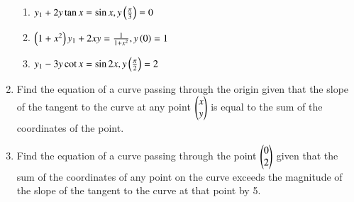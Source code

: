 \begin{enumerate}[label=\arabic*.,ref=\thesubsection.\theenumi]
\begin{enumerate}[label=(\roman*)]
%
\item  $y_1 + 2y\tan x = \sin x, y\left(\frac{\pi}{3}\right) = 0$
\item  $\left(1+x^2\right)y_1 + 2xy = \frac{1}{1+x^2}, y\left(0\right) = 1$
\item  $y_1 - 3y\cot x = \sin 2x, y\left(\frac{\pi}{2}\right) = 2$
\end{enumerate}
\item Find the equation of a curve passing through the origin given that the slope of the tangent to the curve at any point $\begin{pmatrix}x\\ y\end{pmatrix}$ is equal to the sum of the coordinates of the point.
\item  Find the equation of a curve passing through the point $\begin{pmatrix}0\\ 2\end{pmatrix}$ given that the sum of the coordinates of any point on the curve exceeds the magnitude of the slope of the tangent to the curve at that point by 5.
\end{enumerate}
